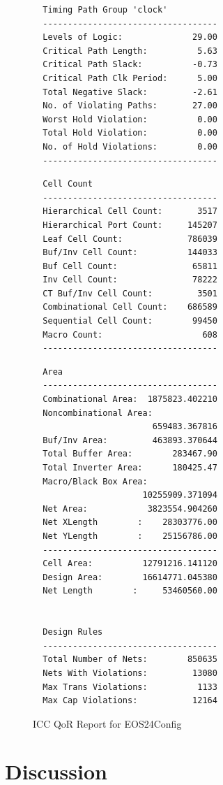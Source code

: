 \documentclass{article}
\begin{document}
\begin{figure}
\begin{multicols}{2}
\begin{verbatim}
  Timing Path Group 'clock'
  -----------------------------------
  Levels of Logic:              29.00
  Critical Path Length:          5.63
  Critical Path Slack:          -0.73
  Critical Path Clk Period:      5.00
  Total Negative Slack:         -2.61
  No. of Violating Paths:       27.00
  Worst Hold Violation:          0.00
  Total Hold Violation:          0.00
  No. of Hold Violations:        0.00
  -----------------------------------
\end{verbatim}
\begin{verbatim}
  Cell Count
  -----------------------------------
  Hierarchical Cell Count:       3517
  Hierarchical Port Count:     145207
  Leaf Cell Count:             786039
  Buf/Inv Cell Count:          144033
  Buf Cell Count:               65811
  Inv Cell Count:               78222
  CT Buf/Inv Cell Count:         3501
  Combinational Cell Count:    686589
  Sequential Cell Count:        99450
  Macro Count:                    608
  -----------------------------------
\end{verbatim}
\begin{verbatim}
  Area
  -----------------------------------
  Combinational Area:  1875823.402210
  Noncombinational Area:
                        659483.367816
  Buf/Inv Area:         463893.370644
  Total Buffer Area:        283467.90
  Total Inverter Area:      180425.47
  Macro/Black Box Area:
                      10255909.371094
  Net Area:            3823554.904260
  Net XLength        :    28303776.00
  Net YLength        :    25156786.00
  -----------------------------------
  Cell Area:          12791216.141120
  Design Area:        16614771.045380
  Net Length        :     53460560.00


  Design Rules
  -----------------------------------
  Total Number of Nets:        850635
  Nets With Violations:         13080
  Max Trans Violations:          1133
  Max Cap Violations:           12164
\end{verbatim}
\end{multicols}
  \caption{ICC QoR Report for EOS24Config}
  \label{res:hwacha-qor}
\end{figure}

\section{Discussion}
\end{document}
